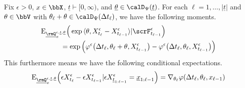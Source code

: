 \begin{proposition}
  \label{proposition:twists}
  Fix $\epsilon > 0$, $\stateVar \in \stateSpace$, $\underline t \vdash [0,\infty)$, and $\underline\twistVar \in \momentSpace(\underline t)$. 
  For each $\ell = 1, \ldots, |\underline t|$ and $\twistVar \in \vecSpace$ with $\twistVar_\ell + \twistVar \in \momentSpace(\Delta t_\ell)$, we have the following moments.
  \begin{equation*}
    \begin{aligned}[t]
      &\Exp_{\fddPrb^{\epsilon, \underline t, \underline\twistVar}_\stateVar}\Big( \exp\prj{\twistVar}{\Xee_{t_\ell}-\Xee_{t_{\ell-1}}} | \scrF^\epsilon_{t_{\ell-1}} \Big)  \\
      &\hspace{1cm} = \exp\Big(\affShift^\epsilon\big(\Delta t_\ell, \twistVar_\ell + \twistVar, \Xee_{t_{\ell-1}} \big)  - \affShift^\epsilon\big(\Delta t_\ell, \twistVar_\ell, \Xee_{t_{\ell-1}} \big)\Big)
    \end{aligned}
  \end{equation*}
  This furthermore means we have the following conditional expectations.
  \begin{equation*}
    \Exp_{\fddPrb^{\epsilon, \underline t,\underline\twistVar}_\stateVar} \Big( \Xe_{t_\ell} - \Xe_{t_{\ell-1}} | \Xe_{\underline t_{1:\ell-1}} = \underline\stateVar_{1:\ell-1} \Big) = \nabla_{\twistVar_\ell}\affShift(\Delta t_\ell, \twistVar_\ell, \stateVar_{\ell-1})
  \end{equation*}
\end{proposition}

